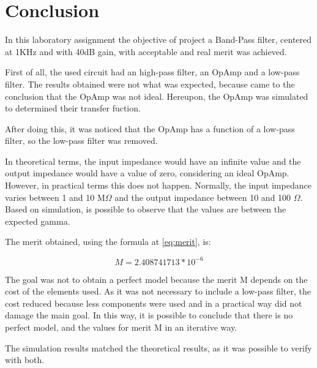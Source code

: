 \newpage
\section{Conclusion}
\label{sec:conclusion}

In this laboratory assignment the objective of project a Band-Pass filter, centered at 1KHz and with 40dB gain, with acceptable and real merit was achieved.

First of all, the used circuit had an high-pass filter, an OpAmp and a low-pass filter. The results obtained were not what was expected, because came to the conclusion that the OpAmp was not ideal. Hereupon, the OpAmp was simulated to determined their transfer fuction. 

After doing this, it was noticed that the OpAmp has a function of a low-pass filter, so the low-pass filter was removed. 

In theoretical terms, the input impedance would have an infinite value and the output impedance would have a value of zero, considering an ideal OpAmp. However, in practical terms this does not happen. Normally, the input impedance varies between 1 and 10 M$\Omega$ and the output impedance between 10 and 100 $\Omega$. Based on simulation, is possible to observe that the values are between the expected gamma.     


The merit obtained, using the formula at \ref{eq:merit}, is:

\begin{equation}
    M = 2.408741713 * 10^{-6}
    \label{eq:meritf}
\end{equation}

The goal was not to obtain a perfect model because the merit M depends on the cost of the elements used. As it was not necessary to include a low-pass filter, the cost reduced because less components were used and in a practical way did not damage the main goal. 
In this way, it is possible to conclude that there is no perfect model, and the values for merit M in an iterative way. 

The simulation results matched the theoretical results, as it was possible to verify with both.  

